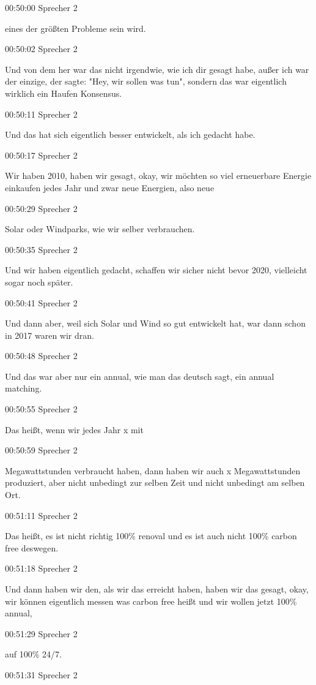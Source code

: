 00:50:00 Sprecher 2

eines der größten Probleme sein wird.

00:50:02 Sprecher 2

Und von dem her war das nicht irgendwie, wie ich dir gesagt habe, außer
ich war der einzige, der sagte: "Hey, wir sollen was tun", sondern das
war eigentlich wirklich ein Haufen Konsensus.

00:50:11 Sprecher 2

Und das hat sich eigentlich besser entwickelt, als ich gedacht habe.

00:50:17 Sprecher 2

Wir haben 2010, haben wir gesagt, okay, wir möchten so viel erneuerbare
Energie einkaufen jedes Jahr und zwar neue Energien, also neue

00:50:29 Sprecher 2

Solar oder Windparks, wie wir selber verbrauchen.

00:50:35 Sprecher 2

Und wir haben eigentlich gedacht, schaffen wir sicher nicht bevor 2020,
vielleicht sogar noch später.

00:50:41 Sprecher 2

Und dann aber, weil sich Solar und Wind so gut entwickelt hat, war dann
schon in 2017 waren wir dran.

00:50:48 Sprecher 2

Und das war aber nur ein annual, wie man das deutsch sagt, ein annual
matching.

00:50:55 Sprecher 2

Das heißt, wenn wir jedes Jahr x mit

00:50:59 Sprecher 2

Megawattstunden verbraucht haben, dann haben wir auch x Megawattstunden
produziert, aber nicht unbedingt zur selben Zeit und nicht unbedingt am
selben Ort.

00:51:11 Sprecher 2

Das heißt, es ist nicht richtig 100\% renoval und es ist auch nicht
100\% carbon free deswegen.

00:51:18 Sprecher 2

Und dann haben wir den, als wir das erreicht haben, haben wir das
gesagt, okay, wir können eigentlich messen was carbon free heißt und wir
wollen jetzt 100\% annual,

00:51:29 Sprecher 2

auf 100\% 24/7.

00:51:31 Sprecher 2

